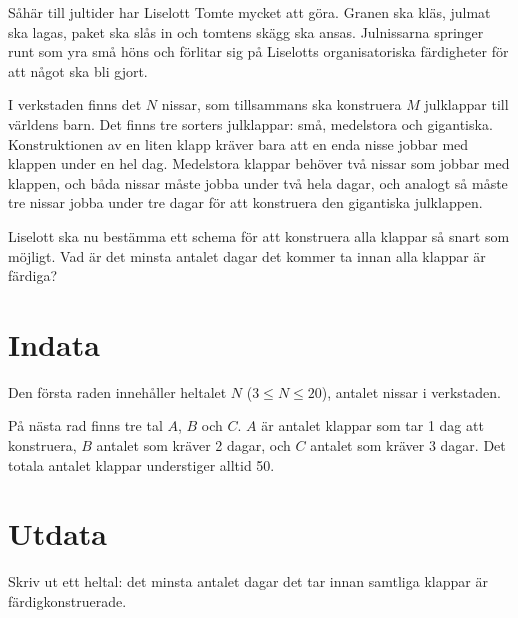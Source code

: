 Såhär till jultider har Liselott Tomte mycket att göra. Granen ska kläs, julmat ska lagas, paket ska slås in och tomtens skägg ska ansas. Julnissarna springer runt som yra små höns och förlitar sig på Liselotts organisatoriska färdigheter för att något ska bli gjort.

I verkstaden finns det $N$ nissar, som tillsammans ska konstruera $M$ julklappar till världens barn. 
 Det finns tre sorters julklappar: små, medelstora och gigantiska. Konstruktionen av en liten klapp kräver bara att en enda nisse jobbar med klappen under en hel dag. Medelstora klappar behöver två nissar som jobbar med klappen, och båda nissar måste jobba under två hela dagar, och analogt så måste tre nissar jobba under tre dagar för att konstruera den gigantiska julklappen.

Liselott ska nu bestämma ett schema för att konstruera alla klappar så snart som möjligt. Vad är det minsta antalet dagar det kommer ta innan alla klappar är färdiga?

\section*{Indata}
Den första raden innehåller heltalet $N$ ($3 \leq N \leq 20$), antalet nissar i verkstaden.

På nästa rad finns tre tal $A$, $B$ och $C$. $A$ är antalet klappar som tar 1 dag att konstruera, $B$ antalet som kräver 2 dagar, och $C$ antalet som kräver 3 dagar. Det totala antalet klappar understiger alltid 50.

\section*{Utdata}
Skriv ut ett heltal: det minsta antalet dagar det tar innan samtliga klappar är färdigkonstruerade.

